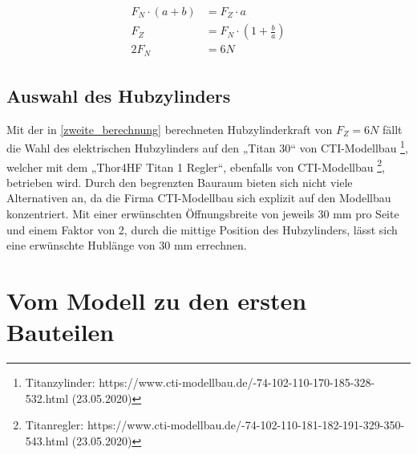 \begin{eqnarray}
\label{zweite_berechnung}
\begin{split}
F_N \cdot(a+b) &= F_Z \cdot a \\
F_Z &= F_N \cdot (1 + \frac{b}{a}) \\
 2F_N &= 6N
\end{split}
\end{eqnarray}

\subsection{Auswahl des Hubzylinders}
Mit der in \eqref{zweite_berechnung} berechneten Hubzylinderkraft von $F_Z=6N$ fällt die Wahl des elektrischen Hubzylinders auf den „Titan 30“ von CTI-Modellbau \footnote[1]{Titanzylinder: https://www.cti-modellbau.de/-74-102-110-170-185-328-532.html (23.05.2020)}, welcher mit dem „Thor4HF Titan 1 Regler“, ebenfalls von CTI-Modellbau  \footnote[2]{Titanregler: https://www.cti-modellbau.de/-74-102-110-181-182-191-329-350-543.html (23.05.2020)}, betrieben wird. Durch den begrenzten Bauraum bieten sich nicht viele Alternativen an, da die Firma CTI-Modellbau sich explizit auf den Modellbau konzentriert.
Mit einer erwünschten Öffnungsbreite von jeweils 30 mm pro Seite und einem Faktor von 2, durch die mittige Position des Hubzylinders, lässt sich eine erwünschte Hublänge von 30 mm errechnen.

\section{Vom Modell zu den ersten Bauteilen}
